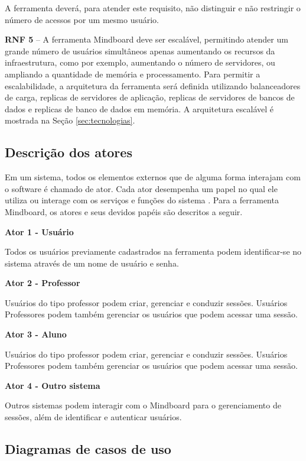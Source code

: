 A ferramenta deverá, para atender este requisito, não distinguir e não restringir o número de acessos por um mesmo usuário.

\textbf{RNF 5} – A ferramenta Mindboard deve ser escalável, permitindo atender um grande número de usuários simultâneos apenas aumentando os recursos da infraestrutura, como por exemplo, aumentando o número de servidores, ou ampliando a quantidade de memória e processamento.  Para permitir a escalabilidade, a arquitetura da ferramenta será definida utilizando balanceadores de carga, replicas de servidores de aplicação, replicas de servidores de bancos de dados e replicas de banco de dados em memória. A arquitetura escalável é mostrada na Seção \ref{sec:tecnologias}.


\subsection{Descrição dos atores}


Em um sistema, todos os elementos externos que de alguma forma interajam com o software é chamado de ator. Cada ator desempenha um papel no qual ele utiliza ou interage com os serviços e funções do sistema \cite{guedes:2009}. Para a ferramenta Mindboard, os atores e seus devidos papéis são descritos a seguir.


\textbf{Ator 1 - Usuário}

Todos os usuários previamente cadastrados na ferramenta podem identificar-se no sistema através de um nome de usuário e senha.

\textbf{Ator 2 - Professor}

Usuários do tipo professor podem criar, gerenciar e conduzir sessões. Usuários Professores podem também gerenciar os usuários que podem acessar uma sessão.

\textbf{Ator 3 - Aluno}

Usuários do tipo professor podem criar, gerenciar e conduzir sessões. Usuários Professores podem também gerenciar os usuários que podem acessar uma sessão.

\textbf{Ator 4 - Outro sistema}

Outros sistemas podem interagir com o Mindboard para o gerenciamento de sessões, além de identificar e autenticar usuários.

\subsection{Diagramas de casos de uso}

